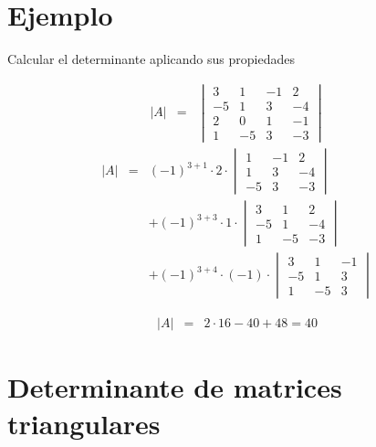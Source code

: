 \documentclass[
]{article}
\begin{document}
\hypertarget{ejemplo-7}{%
\section{Ejemplo}\label{ejemplo-7}}

Calcular el determinante aplicando sus propiedades

\begin{equation*}
\begin{array}{ccc}
|A| &= & \begin{vmatrix} 
           3 & 1 &-1 & 2  \\ 
          -5 & 1 & 3 &-4   \\
           2 & 0 & 1 &-1  \\
           1 &-5 & 3 &-3   
      \end{vmatrix}
\end{array}
\end{equation*} \begin{equation*}
\begin{array}{ccc}
|A| &= &(-1)^{3+1}\cdot 2\cdot \begin{vmatrix} 1 & -1 & 2 \\ 1 & 3 &-4 \\ -5 & 3 & -3 \end{vmatrix} \\
    &  &+ (-1)^{3+3}\cdot 1\cdot       \begin{vmatrix} 3 & 1 & 2  \\ -5 & 1 &-4 \\ 1 & -5 & -3 \end{vmatrix}\\
    &  & + (-1)^{3+4}\cdot(-1)\cdot     \begin{vmatrix} 3 & 1 &-1  \\ -5 & 1 &3  \\ 1 & -5 & 3 \end{vmatrix}
\end{array}
\end{equation*}

\begin{equation*}
\begin{array}{ccc}
|A| &= & 2\cdot 16 - 40 + 48 = 40
\end{array}
\end{equation*}

\hypertarget{determinante-de-matrices-triangulares}{%
\section{Determinante de matrices
triangulares}\label{determinante-de-matrices-triangulares}}
\end{document}
